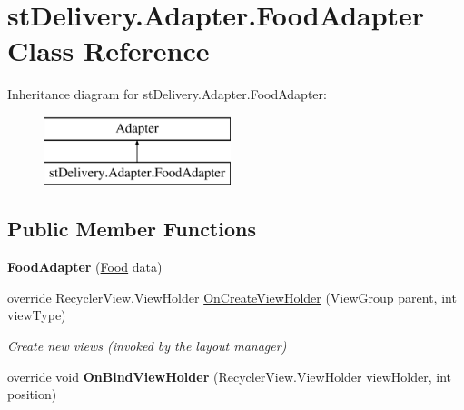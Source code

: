 \hypertarget{classst_delivery_1_1_adapter_1_1_food_adapter}{}\section{st\+Delivery.\+Adapter.\+Food\+Adapter Class Reference}
\label{classst_delivery_1_1_adapter_1_1_food_adapter}
Inheritance diagram for st\+Delivery.\+Adapter.\+Food\+Adapter\+:\begin{figure}[H]
\begin{center}
\leavevmode
\includegraphics[height=2.000000cm]{classst_delivery_1_1_adapter_1_1_food_adapter}
\end{center}
\end{figure}
\subsection*{Public Member Functions}
\begin{DoxyCompactItemize}
\item 
\mbox{\label{classst_delivery_1_1_adapter_1_1_food_adapter_a13e3ec9ae400900c5a5ca8c1f9a57770}} 
{\bfseries Food\+Adapter} (\hyperlink{classst_delivery_1_1_kitchen_1_1_food}{Food} data)
\item 
override Recycler\+View.\+View\+Holder \hyperlink{classst_delivery_1_1_adapter_1_1_food_adapter_af08e76c82d89520bc79576508b4f3b9b}{On\+Create\+View\+Holder} (View\+Group parent, int view\+Type)
\begin{DoxyCompactList}\small\item\em Create new views (invoked by the layout manager) \end{DoxyCompactList}\item 
\mbox{\label{classst_delivery_1_1_adapter_1_1_food_adapter_a0c7f1880a48ba74b87fddd146ecc4a41}} 
override void {\bfseries On\+Bind\+View\+Holder} (Recycler\+View.\+View\+Holder view\+Holder, int position)
\end{DoxyCompactItemize}
